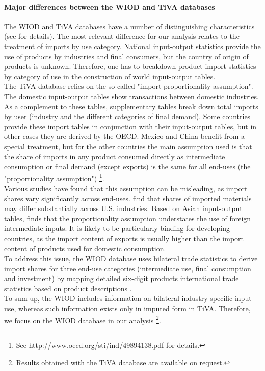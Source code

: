 \documentclass[11pt,a4paper]{article}
\begin{document}
\paragraph{Major differences between the WIOD and TiVA databases}
The WIOD and TiVA databases have a number of distinguishing characteristics (see \cite{Timmer2015} for details). The most relevant difference for our analysis relates to the treatment of imports by use category. National input-output statistics provide the use of products by industries and final consumers, but the country of origin of products is unknown. Therefore, one has to breakdown product import statistics by category of use in the construction of world input-output tables.\\
The TiVA database relies on the so-called "import proportionality assumption". The domestic input-output tables show transactions between domestic industries. As a complement to these tables, supplementary tables break down total imports by user (industry and the different categories of final demand). Some countries provide these import tables in conjunction with their input-output tables, but in other cases they are derived by the OECD. Mexico and China benefit from a special treatment, but for the other countries the main assumption used is that the share of imports in any product consumed directly as intermediate consumption or final demand (except exports) is the same for all end-uses (the "proportionality assumption") \footnote{See http://www.oecd.org/sti/ind/49894138.pdf for details.}.\\
Various studies have found that this assumption can be misleading, as import shares vary significantly across end-uses. \cite{Feenstra2012} find that shares of imported materials may differ substantially across U.S. industries. Based on Asian input-output tables, \cite{Puzzello2012} finds that the proportionality assumption understates the use of foreign intermediate inputs. It is likely to be particularly binding for developing countries, as the import content of exports is usually higher than the import content of products used for domestic consumption.\\
To address this issue, the WIOD database uses bilateral trade statistics to derive import shares for three end-use categories (intermediate use, final consumption and investment) by mapping detailed six-digit products international trade statistics based on product descriptions \citep{Dietzenbacher2013}.\\
To sum up, the WIOD includes information on bilateral industry-specific input use, whereas such information exists only in imputed form in TiVA. Therefore, we focus on the WIOD database in our analysis \footnote{Results obtained with the TiVA database are available on request.}. 
\end{document}

